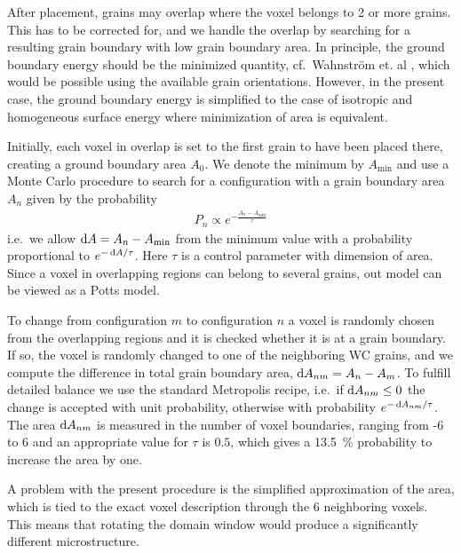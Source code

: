 \documentclass[3p,12pt]{elsarticle}
\begin{document}
After placement, grains may overlap where the voxel belongs to 2 or more grains.
This has to be corrected for, and we handle the overlap by searching for a resulting grain boundary with low grain boundary area.
In principle, the ground boundary energy should be the minimized quantity, cf.\ Wahnström et. al \cite{????_wahnstrom_20??}, which would be possible using the available grain orientations.
However, in the present case, the ground boundary energy is simplified to the case of isotropic and homogeneous surface energy where minimization of area is equivalent.

Initially, each voxel in overlap is set to the first grain to have been placed there, creating a ground boundary area $A_0$.
We denote the minimum by $A_\text{min}$ and use a Monte Carlo procedure to search for a configuration with a grain boundary area $A_n$ given by the probability
\begin{align}
 P_n \propto e^{-\frac{A_n - A_\text{min}}{\tau}}
\end{align}
i.e.\ we allow $\operatorname{d \!} A = A_n - A_\text{min}$ from the minimum value with a probability proportional to $e^{-\operatorname{d \!} A / \tau}$.
Here $\tau$ is a control parameter with dimension of area.
Since a voxel in overlapping regions can belong to several grains, out model can be viewed as a Potts model.

To change from configuration $m$ to configuration $n$ a voxel is randomly chosen from the overlapping regions and it is checked whether it is at a grain boundary.
If so, the voxel is randomly changed to one of the neighboring WC grains, and we compute the difference in total grain boundary area, $\operatorname{d \!} A_{nm} = A_n - A_m$.
To fulfill detailed balance we use the standard Metropolis recipe, i.e.\ if $\operatorname{d \!} A_{nm} \leq 0$ the change is accepted with unit probability, otherwise with probability $e^{-\operatorname{d \!} A_{nm}/\tau}$.
The area $\operatorname{d \!} A_{nm}$ is measured in the number of voxel boundaries, ranging from -6 to 6 and an appropriate value for $\tau$ is $0.5$, which gives a \SI{13.5}{\percent} probability to increase the area by one.

A problem with the present procedure is the simplified approximation of the area, which is tied to the exact voxel description through the 6 neighboring voxels.
This means that rotating the domain window would produce a significantly different microstructure.
\end{document}
